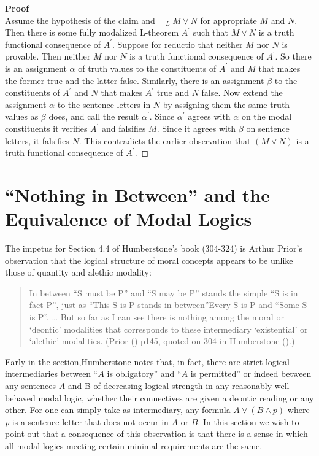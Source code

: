 \documentclass[
  10pt,
  letterpaper,
  DIV=11,
  numbers=noendperiod,
  twoside]{scrartcl}
\begin{document}
\textbf{Proof}\\
Assume the hypothesis of the claim and \(\vdash_LM\vee N\) for
appropriate \(M\) and \(N\). Then there is some fully modalized
L-theorem \(A^\prime\) such that \(M\vee N\) is a truth functional
consequence of \(A^\prime\). Suppose for reductio that neither \(M\) nor
\(N\) is provable. Then neither \(M\) nor \(N\) is a truth functional
consequence of \(A^\prime\). So there is an assignment \(\alpha\) of
truth values to the constituents of \(A^\prime\) and \(M\) that makes
the former true and the latter false. Similarly, there is an assignment
\(\beta\) to the constituents of \(A^\prime\) and \(N\) that makes
\(A^\prime\) true and \(N\) false. Now extend the assignment \(\alpha\)
to the sentence letters in \(N\) by assigning them the same truth values
as \(\beta\) does, and call the result \(\alpha^\prime\). Since
\(\alpha^\prime\) agrees with \(\alpha\) on the modal constituents it
verifies \(A^\prime\) and falsifies \(M\). Since it agrees with
\(\beta\) on sentence letters, it falsifies \(N\). This contradicts the
earlier observation that \((M\vee N)\) is a truth functional consequence
of \(A^\prime\).~◻

\section{``Nothing in Between'' and the Equivalence of Modal
Logics}\label{nothing-in-between-and-the-equivalence-of-modal-logics}

The impetus for Section 4.4 of Humberstone's book (304-324) is Arthur
Prior's observation that the logical structure of moral concepts appears
to be unlike those of quantity and alethic modality:

\begin{quote}
In between ``S must be P'' and ``S may be P'' stands the simple ``S is
in fact P'', just as ``This S is P stands in between''Every S is P and
``Some S is P''. \ldots{} But so far as I can see there is nothing among
the moral or `deontic' modalities that corresponds to these intermediary
`existential' or `alethic' modalities. (Prior
() p145, quoted on 304 in
Humberstone ().)
\end{quote}

Early in the section,Humberstone notes that, in fact, there are strict
logical intermediaries between ``\(A\) is obligatory'' and ``\(A\) is
permitted'' or indeed between any sentences \(A\) and B of decreasing
logical strength in any reasonably well behaved modal logic, whether
their connectives are given a deontic reading or any other. For one can
simply take as intermediary, any formula \(A\vee (B\wedge p)\) where
\emph{p} is a sentence letter that does not occur in \(A\) or \(B\). In
this section we wish to point out that a consequence of this observation
is that there is a sense in which all modal logics meeting certain
minimal requirements are the same.
\end{document}
